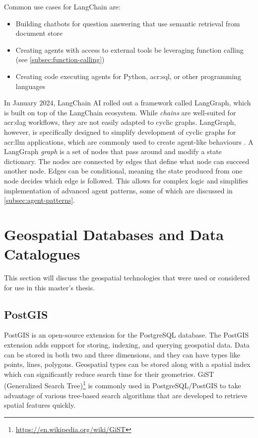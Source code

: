 Common use cases for LangChain are:

\begin{itemize}
    \item Building chatbots for question answering that use semantic retrieval from document store
    \item Creating agents with access to external tools be leveraging function calling (see \autoref{subsec:function-calling})
    \item Creating code executing agents for Python, \acrshort{acr:sql}, or other programming languages
\end{itemize}

In January 2024, LangChain AI rolled out a framework called LangGraph, which is built on top of the LangChain ecosystem. While \textit{chains} are well-suited for \gls{acr:dag} workflows, they are not easily adapted to cyclic graphs. LangGraph, however, is specifically designed to simplify development of cyclic graphs for \acrshort{acr:llm} applications, which are commonly used to create agent-like behaviours \citep{langchainaiLangchainaiLanggraph2024}. A LangGraph \textit{graph} is a set of nodes that pass around and modify a state dictionary. The nodes are connected by edges that define what node can succeed another node. Edges can be conditional, meaning the state produced from one node decides which edge is followed. This allows for complex logic and simplifies implementation of advanced agent patterns, some of which are discussed in \autoref{subsec:agent-patterns}.


\section{Geospatial Databases and Data Catalogues}
\label{sec:geo-dbs-and-data-catalogues}

This section will discuss the geospatial technologies that were used or considered for use in this master's thesis.

\subsection{PostGIS}
\label{subsec:postgis}

PostGIS \citep{PostGIS2001} is an open-source extension for the PostgreSQL database. The PostGIS extension adds support for storing, indexing, and querying geospatial data. Data can be stored in both two and three dimensions, and they can have types like points, lines, polygons. Geospatial types can be stored along with a spatial index which can significantly reduce search time for their geometries. GiST (Generalized Search Tree)\footnote{\url{https://en.wikipedia.org/wiki/GiST}} is commonly used in PostgreSQL/PostGIS to take advantage of various tree-based search algorithms that are developed to retrieve spatial features quickly.

